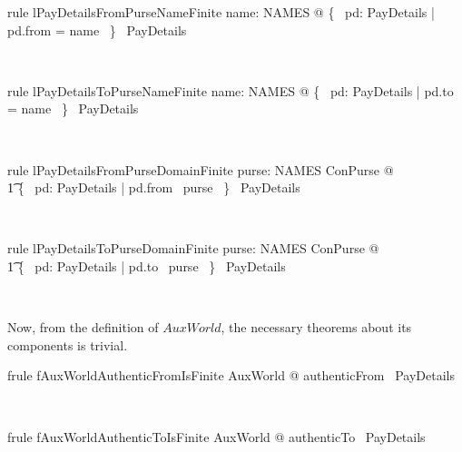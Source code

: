 \begin{LNewLemma}
\begin{theorem}{rule lPayDetailsFromPurseNameFinite}
    \forall name: NAMES @ \{~  pd: PayDetails | pd.from = name ~\} \in \finset~PayDetails
\end{theorem}~\end{LNewLemma}

\begin{LNewLemma}
\begin{theorem}{rule lPayDetailsToPurseNameFinite}
    \forall name: NAMES @ \{~  pd: PayDetails | pd.to = name ~\} \in \finset~PayDetails
\end{theorem}~\end{LNewLemma}

\begin{LNewLemma}
\begin{theorem}{rule lPayDetailsFromPurseDomainFinite}
    \forall purse: NAMES \finj ConPurse  @ \\
        \t1 \{~  pd: PayDetails | pd.from \in \dom~purse ~\} \in \finset~PayDetails
\end{theorem}~\end{LNewLemma}

\begin{LNewLemma}
\begin{theorem}{rule lPayDetailsToPurseDomainFinite}
    \forall purse: NAMES \finj ConPurse  @ \\
        \t1 \{~  pd: PayDetails | pd.to \in \dom~purse ~\} \in \finset~PayDetails
\end{theorem}~\end{LNewLemma}


Now, from the definition of $AuxWorld$, the necessary theorems about its components is trivial.
%
\begin{LFRT}
\begin{theorem}{frule fAuxWorldAuthenticFromIsFinite}
   \forall AuxWorld @ authenticFrom \in \finset~PayDetails
\end{theorem}~\end{LFRT}
%
\begin{LFRT}
\begin{theorem}{frule fAuxWorldAuthenticToIsFinite}
   \forall AuxWorld @ authenticTo \in \finset~PayDetails
\end{theorem}~\end{LFRT}

